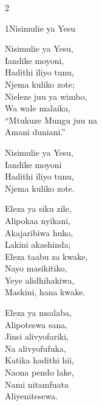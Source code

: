 \clearpage
\begin{multicols}{2}
\setlength{\columnseprule}{0.3pt}
\begin{hymn}{1}{Nisimulie ya Yesu}{}
\begin{stanza}
Nisimulie ya Yesu,\\
Iandike moyoni,\\
Hadithi iliyo tunu,\\
Njema kuliko zote;\\
Nieleze juu ya wimbo,\\
Wa wale malaika,\\
``Mtukuze Mungu juu na\\
Amani duniani.''
\end{stanza}
\begin{chorus}
Nisimulie ya Yesu,\\
Iandike moyoni\\
Hadithi iliyo tunu,\\
Njema kuliko zote.
\end{chorus}
\begin{stanza}
Eleza ya siku zile,\\
Alipokaa nyikani,\\
Akajaribiwa huko,\\
Lakini akashinda;\\
Eleza taabu za kwake,\\
Nayo masikitiko,\\
Yeye alidhihakiwa,\\
Maskini, hana kwake.
\end{stanza}
\begin{stanza}
Eleza ya msalaba,\\
Alipoteswa sana,\\
Jinsi alivyofariki,\\
Na alivyofufuka,\\
Katika hadithi hii,\\
Naona pendo lake,\\
Nami nitamfuata\\
Aliyenitesewa.
\end{stanza}
\end{hymn}


\end{multicols}

